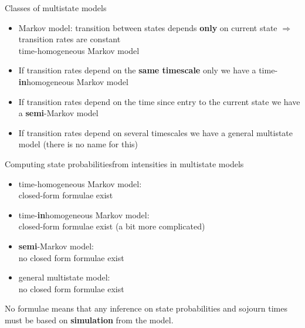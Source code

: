 \begin{frame}{Classes of multistate models}
  \begin{itemize}
  \item Markov model: transition between states depends \textbf{only}
    on current state $\Rightarrow$ transition rates are constant\\
    \alert<5>{time-homogeneous Markov model}
  \item If transition rates depend on the \textbf{same timescale}
    only we have a \alert<5>{time-\textbf{in}homogeneous Markov model}
  \item If transition rates depend on the time since entry to the
    current state we have a \alert<5>{\textbf{semi}-Markov model}
  \item If transition rates depend on several timescales we have a
    \alert<5>{general multistate model} (there is no name for this)
  \end{itemize}
\end{frame}

\begin{frame}{Computing state probabilities\newline from intensities in multistate models}
  \begin{itemize}
  \item time-homogeneous Markov model:\\closed-form formulae exist 
  \item time-\textbf{in}homogeneous Markov model:\\closed-form
    formulae exist (a bit more complicated)
  \item \textbf{semi}-Markov model:\\no closed form formulae exist  
  \item general multistate model:\\no closed form formulae exist  
  \end{itemize}
  \pause
  No formulae means that any inference on state probabilities and sojourn
  times must be based on \textbf{simulation} from the model.
\end{frame}

